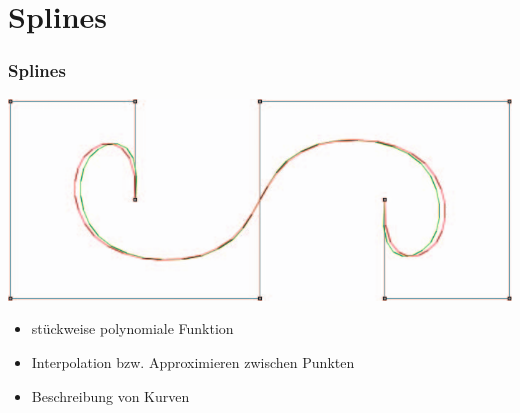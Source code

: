 \documentclass[11pt]{beamer}
\begin{document}
\section{Splines}
\begin{frame}
\frametitle{Splines}
\includegraphics[width=0.6\linewidth]{./Splines.png}
\begin{itemize}
\item stückweise polynomiale Funktion
\item Interpolation bzw. Approximieren zwischen Punkten
\item Beschreibung von Kurven
\end{itemize}

\end{frame}
\end{document}
